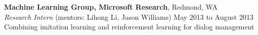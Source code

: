 \documentclass[margin,line]{resume}
\begin{document}
\begin{resume}
{\bf Machine Learning Group, Microsoft Research}, Redmond, WA\\
\emph{Research Intern} (mentors: Lihong Li, Jason Williams) \hfill May 2013 to August 2013\\
Combining imitation learning and reinforcement learning for dialog management 

%

\end{resume}
\end{document}
